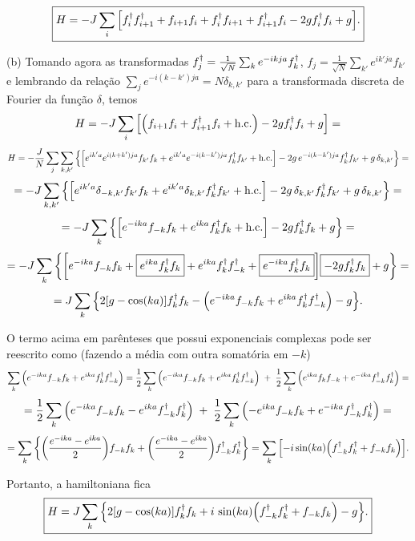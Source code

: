 \documentclass[a4paper,10pt]{article}
\begin{document}
\begin{equation} \label{eq:hamil_transvising}
\boxed{ H =
-J \sum_{i} \qty[ f_i^\dagger f_{i+1}^\dagger + f_{i+1} f_i + f_i^\dagger f_{i+1} + f_{i+1}^\dagger f_i - 2 g f_i^\dagger f_i + g]. }
\end{equation}

\n\n

(b) Tomando agora as transformadas $f_j^\dagger = \frac{1}{\sqrt{N}} \sum_{k} e^{-ikja} f_k^\dagger$, $f_j = \frac{1}{\sqrt{N}} \sum_{k'} e^{ik'ja} f_{k'}$ e lembrando da relação $\sum_{j} e^{-i(k-k')ja} = N \delta_{k,k'}$ para a transformada discreta de Fourier da função $\delta$, temos
$$
H =
-J \sum_{i} \qty[ \Big( f_{i+1} f_i + f_{i+1}^\dagger f_i + \text{h.c.} \Big) - 2 g f_i^\dagger f_i + g] =
$$
$$
H =
-\frac{J}{N} \sum_{j} \sum_{k,k'} \qty{ \qty[ e^{ik'a} e^{i(k+k')ja} f_{k'} f_k + e^{ik'a} e^{-i(k-k')ja} f_k^\dagger f_{k'} + \text{h.c.}] - 2g \, e^{-i(k-k')ja} f_k^\dagger f_{k'} + g \, \delta_{k,k'}} =
$$
$$
=
-J \sum_{k,k'} \qty{ \qty[ e^{ik'a} \delta_{-k,k'} f_{k'} f_k + e^{ik'a} \delta_{k,k'} f_k^\dagger f_{k'} + \text{h.c.}] - 2g \, \delta_{k,k'} f_k^\dagger f_{k'} + g \, \delta_{k,k'}} =
$$
$$
=
-J \sum_{k} \qty{ \qty[ e^{-ika} f_{-k} f_k + e^{ika} f_k^\dagger f_{k} + \text{h.c.}]
- 2 g f_k^\dagger f_k + g } =
$$
$$
=
-J \sum_{k} \qty{ \qty[ e^{-ika} f_{-k} f_k + \boxed{e^{ika} f_k^\dagger f_{k}} + e^{ika} f_{k}^\dagger f_{-k}^\dagger+ \boxed{e^{-ika} f_k^\dagger f_{k}} ]
\boxed{- 2 g f_k^\dagger f_k} + g } =
$$
$$
=
J \sum_{k} \qty{ 2 \qty[g - \cos(ka)] f_k^\dagger f_{k} - \qty( e^{-ika} f_{-k} f_k + e^{ika} f_{k}^\dagger f_{-k}^\dagger) - g }.
$$

O termo acima em parênteses que possui exponenciais complexas pode ser reescrito como (fazendo a média com outra somatória em $-k$)
$$
\sum_{k} \qty( e^{-ika} f_{-k} f_k + e^{ika} f_{k}^\dagger f_{-k}^\dagger ) =
\frac{1}{2} \sum_{k} \qty( e^{-ika} f_{-k} f_k + e^{ika} f_{k}^\dagger f_{-k}^\dagger ) \; + \;
\frac{1}{2} \sum_{k} \qty( e^{ika} f_{k} f_{-k} + e^{-ika} f_{-k}^\dagger f_{k}^\dagger ) =
$$
$$
=
\frac{1}{2} \sum_{k} \qty( e^{-ika} f_{-k} f_k - e^{ika} f_{-k}^\dagger f_{k}^\dagger ) \; + \;
\frac{1}{2} \sum_{k} \qty( -e^{ika} f_{-k} f_k + e^{-ika} f_{-k}^\dagger f_{k}^\dagger ) =
$$
$$
= \sum_{k} \qty{
\qty(\frac{e^{-ika} - e^{ika} }{2}) f_{-k} f_k + \qty(\frac{e^{-ika} - e^{ika} }{2}) f_{-k}^\dagger f_k^\dagger}
= \sum_{k} \qty[ -i \sin(ka) \qty(
f_{-k}^\dagger f_k^\dagger + f_{-k} f_k ) ].
$$

\n

Portanto, a hamiltoniana fica
$$
\boxed{ H =
J \sum_{k} \qty{ 2 \qty[g - \cos(ka)] f_k^\dagger f_{k} + i \, \sin(ka) \qty( f_{-k}^\dagger f_k^\dagger+ f_{-k} f_{k} ) - g }. }
$$

\n\n
\end{document}
